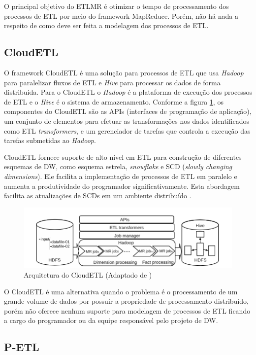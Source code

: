 O principal objetivo do ETLMR é otimizar o tempo de processamento dos processos de ETL por meio do framework MapReduce. Porém, não há nada a respeito de como deve ser feita a modelagem dos processos de ETL.

\subsection{CloudETL}

O framework CloudETL é uma solução para processos de ETL que usa \textit{Hadoop} para paralelizar fluxos de ETL e \textit{Hive} para processar os dados de forma distribuída. Para o CloudETL o \textit{Hadoop} é a plataforma de execução dos processos de ETL e o \textit{Hive} é o sistema de armazenamento. Conforme a figura \ref{cloudetl}, os componentes do CloudETL são as APIs (interfaces de programação de aplicação), um conjunto de elementos para efetuar as transformações nos dados identificados como ETL \textit{transformers}, e um gerenciador de tarefas que controla a execução das tarefas submetidas ao \textit{Hadoop}. 

CloudETL fornece suporte de alto nível em ETL para construção de diferentes esquemas de DW, como esquema estrela, \textit{snowflake} e SCD (\textit{slowly changing dimensions}). Ele facilita a implementação de processos de ETL em paralelo e aumenta a produtividade do programador significativamente. Esta abordagem facilita as atualizações de SCDs em um ambiente distribuído \cite{liu:2013}.

\begin{figure}[h]
	\centering
	\includegraphics[scale=0.9]{fig/cloudetl.png}
	\caption{Arquitetura do CloudETL (Adaptado de \cite{liu:2013})}
	\label{cloudetl}
\end{figure}

O CloudETL é uma alternativa quando o problema é o processamento de um grande volume de dados por possuir a propriedade de processamento distribuído, porém não oferece nenhum suporte para modelagem de processos de ETL ficando a cargo do programador ou da equipe responsável pelo projeto de DW. 


\subsection{P-ETL}

